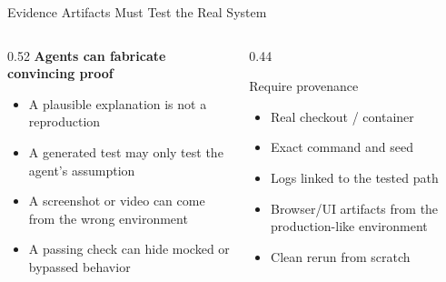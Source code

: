 \begin{frame}{Evidence Artifacts Must Test the Real System}
  \begin{columns}[T, onlytextwidth]
    \begin{column}{0.52\textwidth}
      \textbf{Agents can fabricate convincing proof}\\[0.3em]
      \begin{itemize}
        \item A plausible explanation is not a reproduction
        \item A generated test may only test the agent's assumption
        \item A screenshot or video can come from the wrong environment
        \item A passing check can hide mocked or bypassed behavior
      \end{itemize}
    \end{column}
    \hfill
    \begin{column}{0.44\textwidth}
      \begin{block}{Require provenance}
        \begin{itemize}
          \item Real checkout / container
          \item Exact command and seed
          \item Logs linked to the tested path
          \item Browser/UI artifacts from the production-like environment
          \item Clean rerun from scratch
        \end{itemize}
      \end{block}
    \end{column}
  \end{columns}
\end{frame}


